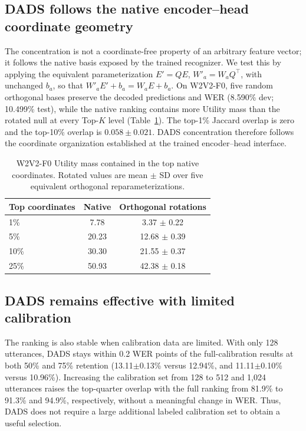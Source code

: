 \documentclass{article}
\begin{document}
\subsection{DADS follows the native encoder--head coordinate geometry}
\label{sec:reparam}
The concentration is not a coordinate-free property of an arbitrary feature
vector; it follows the native basis exposed by the trained recognizer. We test
this by applying the equivalent parameterization $E'=QE$,
$W'_a=W_aQ^\top$, with unchanged $b_a$, so that
$W'_aE'+b_a=W_aE+b_a$. On W2V2-F0, five random orthogonal bases preserve
the decoded predictions and WER (8.590\% dev; 10.499\% test), while the native
ranking contains more Utility mass than the rotated null at every Top-$K$
level (Table~\ref{tab:reparam}). The top-1\% Jaccard overlap is zero and the
top-10\% overlap is $0.058\pm0.021$. DADS concentration therefore follows the
coordinate organization established at the trained encoder--head interface.

\begin{table}[t]
\centering
\small
\caption{W2V2-F0 Utility mass contained in the top native coordinates.
Rotated values are mean $\pm$ SD over five equivalent orthogonal
reparameterizations.}
\label{tab:reparam}
\setlength{\tabcolsep}{3pt}
\renewcommand{\arraystretch}{1.04}
\begin{tabular}{@{}lcc@{}}
\toprule
Top coordinates & Native & Orthogonal rotations \\
\midrule
1\%  & 7.78  & 3.37 $\pm$ 0.22 \\
5\%  & 20.23 & 12.68 $\pm$ 0.39 \\
10\% & 30.30 & 21.55 $\pm$ 0.37 \\
25\% & 50.93 & 42.38 $\pm$ 0.18 \\
\bottomrule
\end{tabular}
\end{table}

\subsection{DADS remains effective with limited calibration}
\label{sec:robustness}
The ranking is also stable when calibration data are limited. With only 128
utterances, DADS stays within 0.2 WER points of the full-calibration results
at both 50\% and 75\% retention (13.11$\pm$0.13\% versus 12.94\%, and
11.11$\pm$0.10\% versus 10.96\%). Increasing the calibration set from 128 to
512 and 1,024 utterances raises the top-quarter overlap with the full ranking
from 81.9\% to 91.3\% and 94.9\%, respectively, without a meaningful change
in WER. Thus, DADS does not require a large additional labeled calibration
set to obtain a useful selection.
\end{document}
